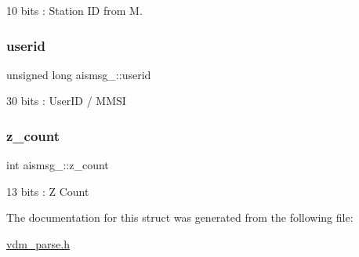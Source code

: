 10 bits \+: Station ID from M. 

\mbox{\label{structaismsg__17_ac5e1b074133bdc942c3dd5fd13b420f8}} 
\subsubsection{\texorpdfstring{userid}{userid}}
{\footnotesize\ttfamily unsigned long aismsg\+\_\+::userid}



30 bits \+: User\+ID / M\+M\+SI 

\mbox{\label{structaismsg__17_ac17316cf543595f13a57ed69a5d7f755}} 
\subsubsection{\texorpdfstring{z\+\_\+count}{z\_count}}
{\footnotesize\ttfamily int aismsg\+\_\+::z\+\_\+count}



13 bits \+: Z Count 



The documentation for this struct was generated from the following file\+:\begin{DoxyCompactItemize}
\item 
\mbox{\hyperlink{vdm__parse_8h}{vdm\+\_\+parse.\+h}}\end{DoxyCompactItemize}
